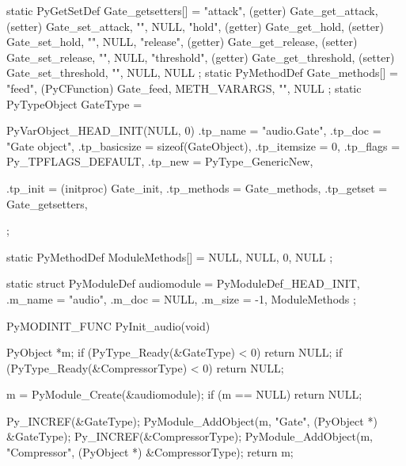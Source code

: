 \begin{pythoncode}
static PyGetSetDef Gate_getsetters[] = {
    {"attack", (getter) Gate_get_attack, (setter) Gate_set_attack, "", NULL},
    {"hold", (getter) Gate_get_hold, (setter) Gate_set_hold, "", NULL},
    {"release", (getter) Gate_get_release, (setter) Gate_set_release, "", NULL},
    {"threshold", (getter) Gate_get_threshold, (setter) Gate_set_threshold, "", NULL},
    {NULL}
};
static PyMethodDef Gate_methods[] = {
    {"feed", (PyCFunction) Gate_feed, METH_VARARGS, ""},
    {NULL}
};
static PyTypeObject GateType = {
    PyVarObject_HEAD_INIT(NULL, 0)
    .tp_name = "audio.Gate",
    .tp_doc = "Gate object",
    .tp_basicsize = sizeof(GateObject),
    .tp_itemsize = 0,
    .tp_flags = Py_TPFLAGS_DEFAULT,
    .tp_new = PyType_GenericNew,

    .tp_init = (initproc) Gate_init,
    .tp_methods = Gate_methods,
    .tp_getset = Gate_getsetters,
};


static PyMethodDef ModuleMethods[] = {
    {NULL, NULL, 0, NULL}
};


static struct PyModuleDef audiomodule = {
    PyModuleDef_HEAD_INIT,
    .m_name = "audio",
    .m_doc = NULL,
    .m_size = -1,
    ModuleMethods
};

PyMODINIT_FUNC PyInit_audio(void) {
    PyObject *m;
    if (PyType_Ready(&GateType) < 0)
        return NULL;
    if (PyType_Ready(&CompressorType) < 0)
        return NULL;

    m = PyModule_Create(&audiomodule);
    if (m == NULL)
        return NULL;

    Py_INCREF(&GateType);
    PyModule_AddObject(m, "Gate", (PyObject *) &GateType);
    Py_INCREF(&CompressorType);
    PyModule_AddObject(m, "Compressor", (PyObject *) &CompressorType);
    return m;
}
\end{pythoncode}
